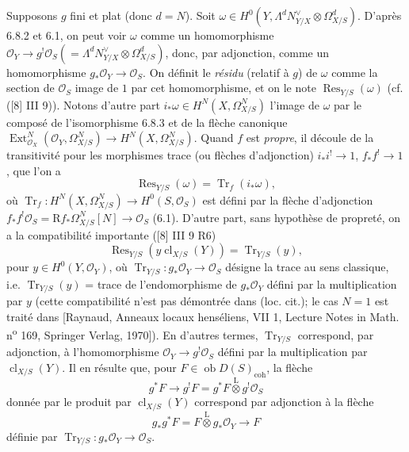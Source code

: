 \documentclass[11pt]{article}
\DeclareMathOperator{\Ext}{Ext}
\newcommand{\R}{\mathrm{R}}\newcommand{\RHomCore}{\mathrm{RHom}}
\newcommand{\ob}{\operatorname{ob}}
\providecommand{\cl}{\operatorname{cl}}
\providecommand{\OO}{\mathcal{O}}
\providecommand{\coh}{\mathrm{coh}}
\providecommand{\ob}{\operatorname{ob}}
\providecommand{\R}{\mathrm R}
\providecommand{\cl}{\operatorname{cl}}
\providecommand{\coh}{\mathrm{coh}}
\providecommand{\cl}{\operatorname{cl}}
\begin{document}
Supposons $g$ fini et plat (donc $d=N$). Soit $\omega\in H^0(Y,\Lambda^d N_{Y/X}^{\vee}\otimes\Omega^d_{X/S})$. D'après 6.8.2 et 6.1, on peut voir $\omega$ comme un homomorphisme $\OO_Y\longrightarrow g^!\OO_S(=\Lambda^d N_{Y/X}^{\vee}\otimes\Omega^d_{X/S})$, donc, par adjonction, comme un homomorphisme $g_*\OO_Y\to\OO_S$. On définit le \emph{résidu} (relatif à $g$) de $\omega$ comme la section de $\OO_S$ image de $1$ par cet homomorphisme, et on le note $\operatorname{Res}_{Y/S}(\omega)$ (cf. ([8] III 9)). Notons d'autre part $i_*\omega\in H^N(X,\Omega^N_{X/S})$ l'image de $\omega$ par le composé de l'isomorphisme 6.8.3 et de la flèche canonique $\Ext^N_{\OO_X}(\OO_Y,\Omega^N_{X/S})\longrightarrow H^N(X,\Omega^N_{X/S})$. Quand $f$ est \emph{propre}, il découle de la transitivité pour les morphismes trace (ou flèches d'adjonction) $i_*i^!\to 1$, $f_*f^!\to 1$, que l'on a
\begin{equation}
\tag{6.8.4}
\operatorname{Res}_{Y/S}(\omega)=\operatorname{Tr}_f(i_*\omega),
\end{equation}
où $\operatorname{Tr}_f:H^N(X,\Omega^N_{X/S})\to H^0(S,\OO_S)$ est défini par la flèche d'adjonction $f_*f^!\OO_S=\R f_*\Omega^N_{X/S}[N]\to\OO_S$ (6.1). D'autre part, sans hypothèse de propreté, on a la compatibilité importante ([8] III 9 R6)
\begin{equation}
\tag{6.8.5}
\operatorname{Res}_{Y/S}(y\cl_{X/S}(Y))=\operatorname{Tr}_{Y/S}(y),
\end{equation}
pour $y\in H^0(Y,\OO_Y)$, où $\operatorname{Tr}_{Y/S}:g_*\OO_Y\to\OO_S$ désigne la trace au sens classique, i.e. $\operatorname{Tr}_{Y/S}(y)$ = trace de l'endomorphisme de $g_*\OO_Y$ défini par la multiplication par $y$ (cette compatibilité n'est pas démontrée dans (loc. cit.); le cas $N=1$ est traité dans [Raynaud, Anneaux locaux henséliens, VII 1, Lecture Notes in Math. n\textsuperscript{o} 169, Springer Verlag, 1970]). En d'autres termes, $\operatorname{Tr}_{Y/S}$ correspond, par adjonction, à l'homomorphisme $\OO_Y\to g^!\OO_S$ défini par la multiplication par $\cl_{X/S}(Y)$. Il en résulte que, pour $F\in\ob D(S)_{\coh}$, la flèche
\begin{equation}
\tag{6.8.6}
g^*F\longrightarrow g^!F=g^*F\overset{\mathrm{L}}{\otimes}g^!\OO_S
\end{equation}
donnée par le produit par $\cl_{X/S}(Y)$ correspond par adjonction à la flèche
\begin{equation}
\tag{6.8.7}
g_*g^*F=F\overset{\mathrm{L}}{\otimes}g_*\OO_Y\longrightarrow F
\end{equation}
définie par $\operatorname{Tr}_{Y/S}:g_*\OO_Y\to\OO_S$.
\end{document}
